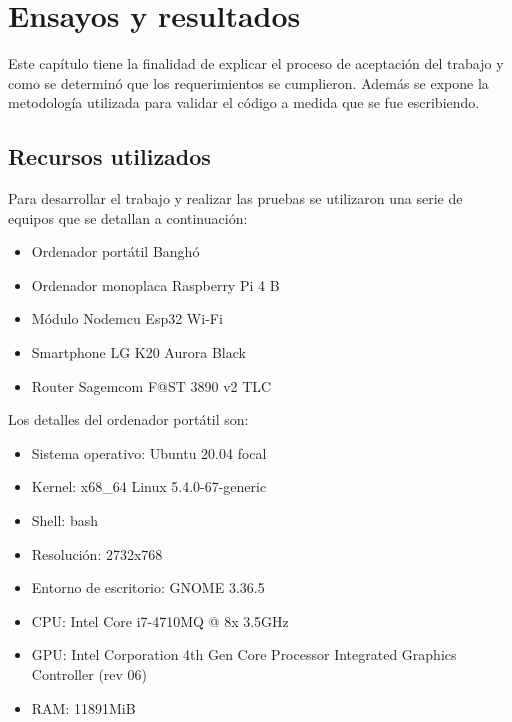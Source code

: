 
\chapter{Ensayos y resultados} %

\label{Chapter4} %


Este capítulo tiene la finalidad de explicar el proceso de aceptación del trabajo y como se determinó que los requerimientos se cumplieron. Además se expone la metodología utilizada para validar el código a medida que se fue escribiendo.

\section{Recursos utilizados}
\label{ch4RecursosUtilizados}

Para desarrollar el trabajo y realizar las pruebas se utilizaron una serie de equipos que se detallan a continuación:

\begin{itemize}
	\item Ordenador portátil Banghó
	\item Ordenador monoplaca Raspberry Pi 4 B
	\item Módulo Nodemcu Esp32 Wi-Fi
	\item Smartphone LG K20 Aurora Black
	\item Router Sagemcom F@ST 3890 v2 TLC
\end{itemize}

Los detalles del ordenador portátil son:

\begin{itemize}
	\item Sistema operativo: Ubuntu 20.04 focal
	\item Kernel: x68\_64 Linux 5.4.0-67-generic
	\item Shell: bash
	\item Resolución: 2732x768
	\item Entorno de escritorio: GNOME 3.36.5
	\item CPU: Intel Core i7-4710MQ @ 8x 3.5GHz
	\item GPU: Intel Corporation 4th Gen Core Processor Integrated Graphics Controller (rev 06)
	\item RAM: 11891MiB
\end{itemize}

